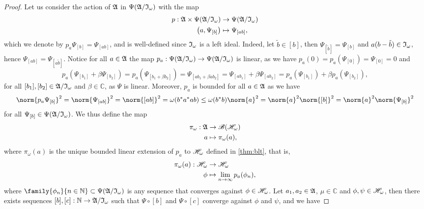 \begin{proof}
    Let us consider the action of \(\mathfrak{A}\) in \(\Psi(\mathfrak{A}/\mathfrak{I}_\omega)\) with the map
    \begin{align*}
        p : \mathfrak{A} \times \Psi(\mathfrak{A}/\mathfrak{I}_\omega) &\to \Psi(\mathfrak{A}/\mathfrak{I}_\omega)\\
        \left(a, \Psi_{[b]}\right) &\mapsto \Psi_{[ab]},
    \end{align*}
    which we denote by \(p_a\Psi_{[b]} = \Psi_{[ab]}\), and is well-defined since \(\mathfrak{I}_\omega\) is a left ideal. Indeed, let \(\tilde{b} \in [b]\), then \(\Psi_{[\tilde{b}]} = \Psi_{[b]}\) and \(a(b - \tilde{b}) \in \mathfrak{I}_\omega\), hence \(\Psi_{[ab]} = \Psi_{[a\tilde{b}]}\). Notice for all \(a \in \mathfrak{A}\) the map \(p_a : \Psi(\mathfrak{A}/\mathfrak{I}_\omega) \to \Psi(\mathfrak{A}/\mathfrak{I}_\omega)\) is linear, as we have \(p_a(0) = p_a(\Psi_{[0]}) = \Psi_{[0]} = 0\) and
    \begin{equation*}
        p_a(\Psi_{[b_1]} + \beta \Psi_{[b_2]}) = p_a(\Psi_{[b_1 + \beta b_2]}) = \Psi_{[ab_1 + \beta ab_2]} = \Psi_{[ab_1]} + \beta \Psi_{[ab_2]} = p_a(\Psi_{[b_1]}) + \beta p_a(\Psi_{[b_2]}),
    \end{equation*}
    for all \([b_1], [b_2] \in \mathfrak{A}/\mathfrak{I}_\omega\) and \(\beta \in \mathbb{C}\), as \(\Psi\) is linear. Moreover, \(p_a\) is bounded for all \(a \in \mathfrak{A}\) as we have
    \begin{equation*}
        \norm{p_a\Psi_{[b]}}^2 = \norm{\Psi_{[ab]}}^2 = \norm{[ab]}^2 = \omega(b^*a^*ab) \leq \omega(b^*b) \norm{a}^2 = \norm{a}^2 \norm{[b]}^2 = \norm{a}^2\norm{\Psi_{[b]}}^2
    \end{equation*}
    for all \(\Psi_{[b]} \in \Psi(\mathfrak{A}/\mathfrak{I}_\omega)\). We thus define the map
    \begin{align*}
        \pi_{\omega} : \mathfrak{A} &\to \mathscr{B}(\mathscr{H}_\omega)\\
                                 a &\mapsto \pi_\omega(a),
    \end{align*}
    where \(\pi_\omega(a)\) is the unique bounded linear extension of \(p_a\) to \(\mathscr{H}_\omega\) defined in \cref{thm:blt}, that is,
    \begin{align*}
        \pi_\omega(a) : \mathscr{H}_\omega &\to \mathscr{H}_\omega\\
                                   \phi &\mapsto \lim_{n\to\infty}{p_a(\phi_n)},
    \end{align*}
    where \(\family{\phi_n}{n\in \mathbb{N}} \subset \Psi(\algebra{A}/\algebra{I}_\omega)\) is any sequence that converges against \(\phi \in \mathscr{H}_\omega\). Let \(a_1, a_2 \in \mathfrak{A}\), \(\mu\in \mathbb{C}\) and \(\phi, \psi \in \mathscr{H}_\omega\), then there exists sequences \([b], [c]: \mathbb{N} \to \mathfrak{A}/\mathfrak{I}_\omega\) such that \(\Psi \circ [b]\) and \(\Psi \circ [c]\) converge against \(\phi\) and \(\psi\), and we have

\end{proof}
